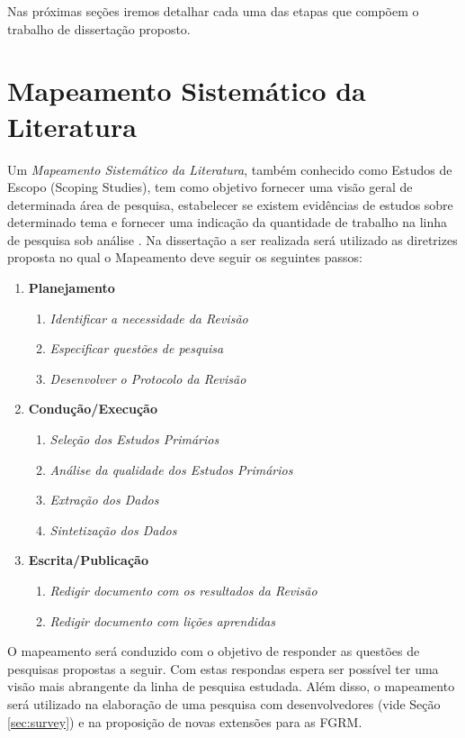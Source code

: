 \documentclass[msc,proposal,hidelot,hideabstract]{ppgccufmg} %
\begin{document}
Nas próximas seções iremos detalhar cada uma das etapas que compõem o trabalho de dissertação proposto.

\section{Mapeamento Sistemático da Literatura}
\label{sec:revisao_sistematica}

Um \textit{Mapeamento Sistemático da Literatura}, também conhecido como Estudos de Escopo (Scoping Studies), tem como objetivo fornecer uma visão geral de determinada área de pesquisa, estabelecer se existem evidências de estudos sobre determinado tema e fornecer uma indicação da quantidade de trabalho na linha de pesquisa sob análise \cite{keele2007guidelines,wohlin2012experimentation}. Na dissertação a ser realizada será utilizado as diretrizes proposta \cite{keele2007guidelines} no qual o Mapeamento deve seguir os seguintes passos:

\begin{enumerate}
  \item \textbf{Planejamento}
  \begin{enumerate}
    \item \textit{Identificar a necessidade da Revisão}
    \item \textit{Especificar questões de pesquisa}
    \item \textit{Desenvolver o Protocolo da Revisão}
  \end{enumerate}
  \item \textbf{Condução/Execução}
  \begin{enumerate}
    \item \textit{Seleção dos Estudos Primários}
    \item \textit{Análise da qualidade dos Estudos Primários}
     \item \textit{Extração dos Dados}
     \item \textit{Sintetização dos Dados}
   \end{enumerate}
  \item \textbf{Escrita/Publicação}
  \begin{enumerate}
    \item \textit{Redigir documento com os resultados da Revisão}
    \item \textit{Redigir documento com lições aprendidas}
  \end{enumerate}
\end{enumerate}

O mapeamento será conduzido com o objetivo de responder as questões de pesquisas propostas a seguir. Com estas respondas espera ser possível ter uma visão mais abrangente da linha de pesquisa estudada. Além disso, o mapeamento será utilizado na elaboração de uma pesquisa com desenvolvedores (vide Seção \ref{sec:survey}) e na proposição de novas extensões para as FGRM.
\end{document}
